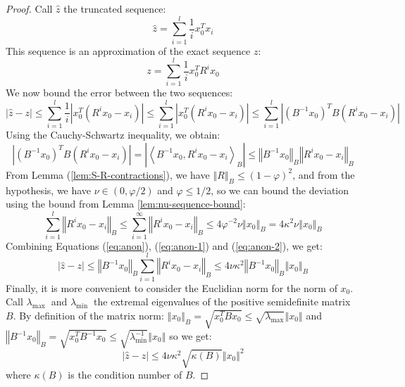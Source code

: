 \begin{proof}

Call $\hat{z}$ the truncated sequence: 
\[
\hat{z}=\sum_{i=1}^{l}\frac{1}{i}x_{0}^{T}x_{i}
\]
This sequence is an approximation of the exact sequence $z$: 
\[
z=\sum_{i=1}^{l}\frac{1}{i}x_{0}^{T}R^{i}x_{0}
\]
We now bound the error between the two sequences: 
\begin{equation}
\left|\hat{z}-z\right|\leq\sum_{i=1}^{l}\frac{1}{i}\left|x_{0}^{T}\left(R^{i}x_{0}-x_{i}\right)\right|\leq\sum_{i=1}^{l}\left|x_{0}^{T}\left(R^{i}x_{0}-x_{i}\right)\right|\leq\sum_{i=1}^{l}\left|\left(B^{-1}x_{0}\right)^{T}B\left(R^{i}x_{0}-x_{i}\right)\right|\label{eq:anon}
\end{equation}
Using the Cauchy-Schwartz inequality, we obtain: 
\begin{equation}
\left|\left(B^{-1}x_{0}\right)^{T}B\left(R^{i}x_{0}-x_{i}\right)\right|=\left|\left\langle B^{-1}x_{0},R^{i}x_{0}-x_{i}\right\rangle _{B}\right|\leq\left\Vert B^{-1}x_{0}\right\Vert _{B}\left\Vert R^{i}x_{0}-x_{i}\right\Vert _{B}\label{eq:anon-1}
\end{equation}
 From Lemma (\ref{lem:S-R-contractions}), we have $\left\Vert R\right\Vert _{B}\leq\left(1-\varphi\right)^{2}$,
and from the hypothesis, we have $\nu\in\left(0,\varphi/2\right)$
and $\varphi\le1/2$, so we can bound the deviation using the bound
from Lemma \ref{lem:nu-sequence-bound}:
\begin{equation}
\sum_{i=1}^{l}\left\Vert R^{i}x_{0}-x_{i}\right\Vert _{B}\leq\sum_{i=1}^{\infty}\left\Vert R^{i}x_{0}-x_{i}\right\Vert _{B}\leq4\varphi^{-2}\nu\left\Vert x_{0}\right\Vert _{B}=4\kappa^{2}\nu\left\Vert x_{0}\right\Vert _{B}\label{eq:anon-2}
\end{equation}
Combining Equations (\ref{eq:anon}), (\ref{eq:anon-1}) and (\ref{eq:anon-2}),
we get: 
\[
\left|\hat{z}-z\right|\leq\left\Vert B^{-1}x_{0}\right\Vert _{B}\sum_{i=1}^{l}\left\Vert R^{i}x_{0}-x_{i}\right\Vert _{B}\leq4\nu\kappa^{2}\left\Vert B^{-1}x_{0}\right\Vert _{B}\left\Vert x_{0}\right\Vert _{B}
\]
Finally, it is more convenient to consider the Euclidian norm for
the norm of $x_{0}$. Call $\lambda_{\text{max }}$ and $\lambda_{\text{min }}$
the extremal eigenvalues of the positive semidefinite matrix $B$.
By definition of the matrix norm: $\left\Vert x_{0}\right\Vert _{B}=\sqrt{x_{0}^{T}Bx_{0}}\leq\sqrt{\lambda_{\text{max}}}\left\Vert x_{0}\right\Vert $
and $\left\Vert B^{-1}x_{0}\right\Vert _{B}=\sqrt{x_{0}^{T}B^{-1}x_{0}}\leq\sqrt{\lambda_{\text{min}}^{-1}}\left\Vert x_{0}\right\Vert $
so we get:
\[
\left|\hat{z}-z\right|\leq4\nu\kappa^{2}\sqrt{\kappa\left(B\right)}\left\Vert x_{0}\right\Vert ^{2}
\]
where $\kappa\left(B\right)$ is the condition number of $B$. \end{proof}

